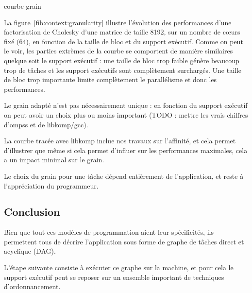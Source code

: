 \begin{todo}
  courbe grain
\end{todo}

La figure~\ref{fib:context:granularity} illustre l'évolution des performances d'une factorisation de Cholesky d'une matrice de taille 8192, sur un nombre de cœurs fixé (64), en fonction de la taille de bloc et du support exécutif.
Comme on peut le voir, les parties extrèmes de la courbe se comportent de manière similaires quelque soit le support exécutif : une taille de bloc trop faible génère beaucoup trop de tâches et les support exécutifs sont complètement surchargés. Une taille de bloc trop importante limite complètement le parallélisme et donc les performances.

Le grain adapté n'est pas nécessairement unique : en fonction du support exécutif on peut avoir un choix plus ou moins important (TODO : mettre les vrais chiffres d'ompss et de libkomp/gcc).

La courbe tracée avec libkomp inclue nos travaux sur l'affinité, et cela permet d'illustrer que même si cela permet d'influer sur les performances maximales, cela a un impact minimal sur le grain.



Le choix du grain pour une tâche dépend entièrement de l'application, et reste à l'appréciation du programmeur.

\subsection*{Conclusion}

Bien que tout ces modèles de programmation aient leur spécificités, ils permettent tous de décrire l'application sous forme de graphe de tâches direct et acyclique (DAG).

L'étape suivante consiste à exécuter ce graphe sur la machine, et pour cela le support exécutif peut se reposer sur un ensemble important de techniques d'ordonnancement. 


